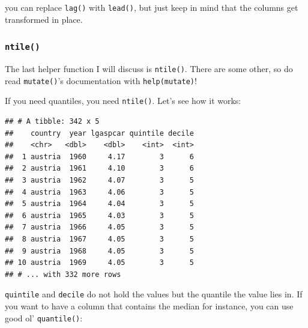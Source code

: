 \documentclass[]{gitbook}
\newenvironment{Shaded}{\begin{snugshade}}{\end{snugshade}}
\newcommand{\CommentTok}[1]{\textcolor[rgb]{0.56,0.35,0.01}{\textit{#1}}}
\newcommand{\DataTypeTok}[1]{\textcolor[rgb]{0.13,0.29,0.53}{#1}}
\newcommand{\DecValTok}[1]{\textcolor[rgb]{0.00,0.00,0.81}{#1}}
\newcommand{\FloatTok}[1]{\textcolor[rgb]{0.00,0.00,0.81}{#1}}
\newcommand{\KeywordTok}[1]{\textcolor[rgb]{0.13,0.29,0.53}{\textbf{#1}}}
\newcommand{\NormalTok}[1]{#1}
\newcommand{\OperatorTok}[1]{\textcolor[rgb]{0.81,0.36,0.00}{\textbf{#1}}}
\newcommand{\StringTok}[1]{\textcolor[rgb]{0.31,0.60,0.02}{#1}}
\begin{document}
you can replace \texttt{lag()} with \texttt{lead()}, but just keep in mind that the columns get transformed in
place.

\hypertarget{ntile}{%
\subsubsection{\texorpdfstring{\texttt{ntile()}}{ntile()}}\label{ntile}}

The last helper function I will discuss is \texttt{ntile()}. There are some other, so do read \texttt{mutate()}'s
documentation with \texttt{help(mutate)}!

If you need quantiles, you need \texttt{ntile()}. Let's see how it works:

\begin{Shaded}
\end{Shaded}

\begin{verbatim}
## # A tibble: 342 x 5
##    country  year lgaspcar quintile decile
##    <chr>   <dbl>    <dbl>    <int>  <int>
##  1 austria  1960     4.17        3      6
##  2 austria  1961     4.10        3      6
##  3 austria  1962     4.07        3      5
##  4 austria  1963     4.06        3      5
##  5 austria  1964     4.04        3      5
##  6 austria  1965     4.03        3      5
##  7 austria  1966     4.05        3      5
##  8 austria  1967     4.05        3      5
##  9 austria  1968     4.05        3      5
## 10 austria  1969     4.05        3      5
## # ... with 332 more rows
\end{verbatim}

\texttt{quintile} and \texttt{decile} do not hold the values but the quantile the value lies in. If you want to
have a column that contains the median for instance, you can use good ol' \texttt{quantile()}:

\begin{Shaded}
\end{Shaded}
\end{document}
